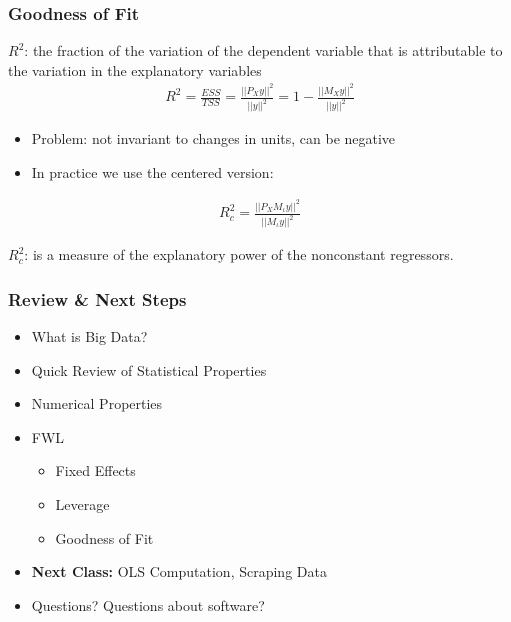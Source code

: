 \documentclass[
  shownotes,
  xcolor={svgnames},
  hyperref={colorlinks,citecolor=DarkBlue,linkcolor=DarkRed,urlcolor=DarkBlue}
  ]{beamer}
\begin{document}
\begin{frame}
\frametitle{Goodness of Fit}
{\bf $R^2$}: the fraction of the variation of the dependent variable that is attributable to the variation in the explanatory variables
\bigskip
\begin{align}
R^2 = \frac{ESS}{TSS}=\frac{||P_Xy||^2}{||y||^2}=1-\frac{||M_Xy||^2}{||y||^2}
\end{align}

\begin{itemize}
  \item Problem:  not invariant to changes in units, can be negative
  \item In practice we use the centered version:
\end{itemize}

\begin{align}
R^2_c=\frac{||P_XM_\iota y||^2}{||M_\iota y||^2}
\end{align}

{\bf $R^2_c$}: is a measure of the explanatory power of the nonconstant regressors.


\end{frame}
\begin{frame}
\frametitle{Review \& Next Steps}
  
  \begin{itemize} 
    \item What is Big Data?
    \medskip
    \item Quick Review of Statistical Properties
    \medskip
    \item Numerical Properties
    \medskip
    \item FWL
    \begin{itemize}
    \item Fixed Effects
    \item Leverage
    \item Goodness of Fit
  \end{itemize}
  \bigskip  

  
  \item  {\bf Next Class:} OLS Computation, Scraping Data
  \bigskip
  \item Questions? Questions about software? 
  
  \end{itemize}


\end{frame}
\end{document}
